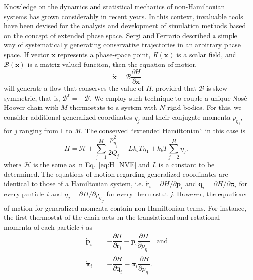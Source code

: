 \documentclass[aip,jcp,reprint,amsmath,amssymb,raggedbottom]{revtex4-1}
\newcommand{\vt}[1]{\boldsymbol{\mathbf{#1}}}           %
\newcommand{\tr}[1]{#1^t}                               %
\newcommand{\diff}[2]{\dfrac{\partial #1}{\partial #2}} %
\begin{document}
Knowledge on the dynamics and statistical mechanics of non-Hamiltonian systems has grown considerably in recent years.\cite{Tuckerman_1999, Tuckerman2001, Sergi2001, Sergi2003, Ezra2004, Sergi2004, Ezra2006, Sergi2010b} In this context, invaluable tools have been devised for the analysis and development of simulation methods based on the concept of extended phase space. Sergi and Ferrario\cite{Sergi2001} described a simple way of systematically generating conservative trajectories in an arbitrary phase space. If vector $\vt x$ represents a phase-space point, $H(\vt x)$ is a scalar field, and $\boldsymbol{\mathcal B}(\vt x)$ is a matrix-valued function, then the equation of motion
\begin{equation} \label{eq:eq_of_motion}
\dot{\vt x} = \boldsymbol{\mathcal B}\diff{H}{\vt x}
\end{equation}
will generate a flow that conserves the value of $H$, provided that $\boldsymbol{\mathcal B}$ is skew-symmetric, that is, $\tr{ \boldsymbol{ \mathcal B }} = -\boldsymbol{ \mathcal B }$. We employ such technique to couple a unique Nos\'{e}-Hoover chain\cite{Martyna1992} with $M$ thermostats to a system with $N$ rigid bodies. For this, we consider additional generalized coordinates $\eta_j$ and their conjugate momenta $p_{\eta_j}$, for $j$ ranging from $1$ to $M$. The conserved ``extended Hamiltonian'' in this case is
\begin{equation}
\label{eq:H_nvt}
H = \mathcal{H} + \sum_{j=1}^{M}\frac{p_{\eta_j}^2}{2Q_j} + L k_bT\eta_1 + k_bT\sum_{j=2}^M \eta_j,
\end{equation}
where $\mathcal H$ is the same as in Eq.~\ref{eq:H_NVE} and $L$ is a constant to be determined. The equations of motion regarding generalized coordinates are identical to those of a Hamiltonian system, i.e. $\dot{\vt r}_i = {\partial H}/{\partial \vt p_i}$ and $\dot{\vt q}_i = {\partial H}/{\partial \vt \pi_i}$ for every particle $i$ and $\dot{\eta}_j = {\partial H}/{\partial {p_\eta}_j}$ for every thermostat $j$. However, the equations of motion for generalized momenta contain non-Hamiltonian terms. For instance, the first thermostat of the chain acts on the translational and rotational momenta of each particle $i$ as
\[
\begin{split}
\dot{\vt p}_i &= -\diff{H}{\vt r_i} - {\vt p}_i \diff{H}{p_{\eta_1}} \quad \text{and} \\
\dot{\vt \pi}_i &= -\diff{H}{\vt q_i} - {\vt \pi}_i \diff{H}{p_{\eta_1}}.
\end{split}
\]
\end{document}
